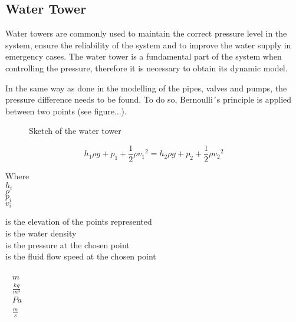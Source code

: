 \subsection{Water Tower} 
\label{WaterTankModel}

Water towers are commonly used to maintain the correct pressure level in the system, ensure the reliability of the system 
and to improve the water supply in emergency cases. The water tower is a fundamental part of the system when controlling the pressure, therefore it is 
necessary to obtain its dynamic model. 

In the same way as done in the modelling of the pipes, valves and pumps, the pressure difference needs to be found. 
To do so, Bernoulli´s principle is applied between two points (see figure...).


\begin{figure}[H]
\centering
 
\caption{Sketch of the water tower}
\label{fig:watertower_sketch}
\end{figure}


\begin{equation}
  \label{bernoulli}
  h_1\rho g + p_1 + \frac{1}{2}\rho {v_1}^2 = h_2\rho g + p_2 + \frac{1}{2}\rho {v_2}^2
\end{equation}

\begin{minipage}[t]{0.20\textwidth}
Where\\
\hspace*{8mm} $h_i$ \\
\hspace*{8mm} $\rho$ \\
\hspace*{8mm} $p_i$ \\
\hspace*{8mm} $v_i$ \\

\end{minipage}
\begin{minipage}[t]{0.68\textwidth}
\vspace*{2mm}
is the elevation of the points represented\\
is the water density\\
is the pressure at the chosen point\\
is the fluid flow speed at the chosen point
\end{minipage}
\begin{minipage}[t]{0.10\textwidth}
\vspace*{2mm}
\textcolor{White}{te}$\unit{m}$\\
\textcolor{White}{te}$\unit{\frac{kg}{m^3}}$\\
\textcolor{White}{te}$\unit{Pa}$\\
\textcolor{White}{te}$\unit{\frac{m}{s}}$
\end{minipage}

